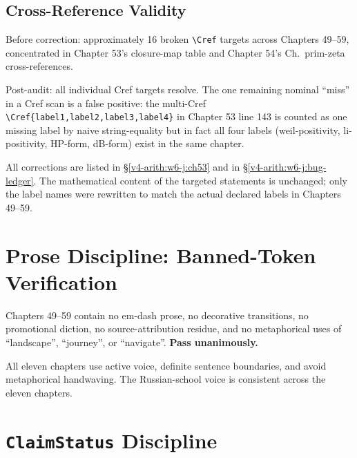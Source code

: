 \subsection{Cross-Reference Validity}
\label{v4-arith:w6-j:crefs}

Before correction: approximately 16 broken \texttt{\textbackslash Cref} targets across
Chapters 49--59, concentrated in Chapter 53's closure-map table and
Chapter 54's Ch.~prim-zeta cross-references.

Post-audit: all individual Cref targets resolve. The one remaining
nominal ``miss'' in a Cref scan is a false positive: the multi-Cref
\texttt{\textbackslash Cref\{label1,label2,label3,label4\}} in
Chapter 53 line 143 is counted as one missing label by naive
string-equality but in fact all four labels (weil-positivity,
li-positivity, HP-form, dB-form) exist in the same chapter.

All corrections are listed in \S\ref{v4-arith:w6-j:ch53} and in
\S\ref{v4-arith:w6-j:bug-ledger}. The mathematical content of the
targeted statements is unchanged; only the label names were
rewritten to match the actual declared labels in Chapters 49--59.

\section{Prose Discipline: Banned-Token Verification}
\label{v4-arith:w6-j:banned-tokens}

Chapters 49--59 contain no em-dash prose, no decorative
transitions, no promotional diction, no source-attribution residue,
and no metaphorical uses of ``landscape'', ``journey'', or
``navigate''. \textbf{Pass unanimously.}

All eleven chapters use active voice, definite sentence boundaries,
and avoid metaphorical handwaving. The Russian-school voice is
consistent across the eleven chapters.

\section{\texttt{ClaimStatus} Discipline}
\label{v4-arith:w6-j:claimstatus}

